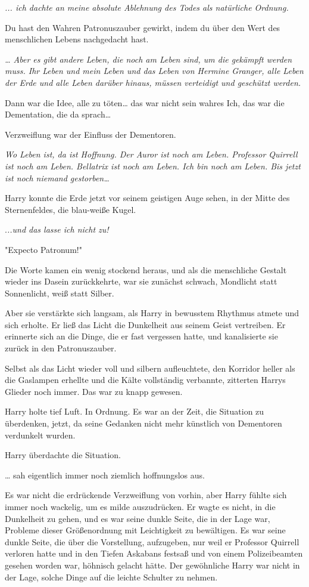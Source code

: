 {\emph{..\emph{. ich dachte an meine absolute Ablehnung des Todes als natürliche Ordnung.}}

Du hast den Wahren Patronuszauber gewirkt, indem du über den Wert des menschlichen Lebens nachgedacht hast.

\emph{… Aber es gibt andere Leben, die noch am Leben sind, um die gekämpft werden muss. Ihr Leben und mein Leben und das Leben von Hermine Granger, alle Leben der Erde und alle Leben darüber hinaus, müssen verteidigt und geschützt werden.}

Dann war die Idee, alle zu töten… das war nicht sein wahres Ich, das war die Dementation, die da sprach…

Verzweiflung war der Einfluss der Dementoren.

\emph{Wo Leben ist, da ist Hoffnung. Der Auror ist noch am Leben. Professor Quirrell ist noch am Leben. Bellatrix ist noch am Leben. Ich bin noch am Leben. Bis jetzt ist noch niemand gestorben…}

Harry konnte die Erde jetzt vor seinem geistigen Auge sehen, in der Mitte des Sternenfeldes, die blau-weiße Kugel.

.\emph{..und das lasse ich nicht zu!}

"Expecto Patronum!"

Die Worte kamen ein wenig stockend heraus, und als die menschliche Gestalt wieder ins Dasein zurückkehrte, war sie zunächst schwach, Mondlicht statt Sonnenlicht, weiß statt Silber.

Aber sie verstärkte sich langsam, als Harry in bewusstem Rhythmus atmete und sich erholte. Er ließ das Licht die Dunkelheit aus seinem Geist vertreiben. Er erinnerte sich an die Dinge, die er fast vergessen hatte, und kanalisierte sie zurück in den Patronuszauber.

Selbst als das Licht wieder voll und silbern aufleuchtete, den Korridor heller als die Gaslampen erhellte und die Kälte vollständig verbannte, zitterten Harrys Glieder noch immer. Das war zu knapp gewesen.

Harry holte tief Luft. In Ordnung. Es war an der Zeit, die Situation zu überdenken, jetzt, da seine Gedanken nicht mehr künstlich von Dementoren verdunkelt wurden.

Harry überdachte die Situation.

… sah eigentlich immer noch ziemlich hoffnungslos aus.

Es war nicht die erdrückende Verzweiflung von vorhin, aber Harry fühlte sich immer noch wackelig, um es milde auszudrücken. Er wagte es nicht, in die Dunkelheit zu gehen, und es war seine dunkle Seite, die in der Lage war, Probleme dieser Größenordnung mit Leichtigkeit zu bewältigen. Es war seine dunkle Seite, die über die Vorstellung, aufzugeben, nur weil er Professor Quirrell verloren hatte und in den Tiefen Askabans festsaß und von einem Polizeibeamten gesehen worden war, höhnisch gelacht hätte. Der gewöhnliche Harry war nicht in der Lage, solche Dinge auf die leichte Schulter zu nehmen.

}
